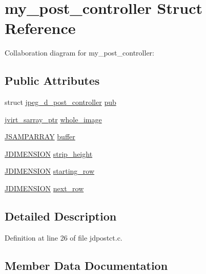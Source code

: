 \hypertarget{structmy__post__controller}{}\section{my\+\_\+post\+\_\+controller Struct Reference}
\label{structmy__post__controller}


Collaboration diagram for my\+\_\+post\+\_\+controller\+:
\subsection*{Public Attributes}
\begin{DoxyCompactItemize}
\item 
struct \mbox{\hyperlink{structjpeg__d__post__controller}{jpeg\+\_\+d\+\_\+post\+\_\+controller}} \mbox{\hyperlink{structmy__post__controller_a4618ce845c38c4c563bdd28af061b727}{pub}}
\item 
\mbox{\hyperlink{jpeglib_8h_abc0b975077507c35b5a577e3ce9e4d91}{jvirt\+\_\+sarray\+\_\+ptr}} \mbox{\hyperlink{structmy__post__controller_ac2336623f2e802993b35b7db30053b68}{whole\+\_\+image}}
\item 
\mbox{\hyperlink{jpeglib_8h_ac9d5d1b829ed51769db69a37271a7e91}{J\+S\+A\+M\+P\+A\+R\+R\+AY}} \mbox{\hyperlink{structmy__post__controller_aa571ce1fd2b5171a40d3b18d1496a2cf}{buffer}}
\item 
\mbox{\hyperlink{jmorecfg_8h_a04ed4674f6f1d0d50ec241531e38274f}{J\+D\+I\+M\+E\+N\+S\+I\+ON}} \mbox{\hyperlink{structmy__post__controller_a50ed0e70f9acab0995bbffb3aef6e9aa}{strip\+\_\+height}}
\item 
\mbox{\hyperlink{jmorecfg_8h_a04ed4674f6f1d0d50ec241531e38274f}{J\+D\+I\+M\+E\+N\+S\+I\+ON}} \mbox{\hyperlink{structmy__post__controller_a1e762395815d8f552d1a412cb5201575}{starting\+\_\+row}}
\item 
\mbox{\hyperlink{jmorecfg_8h_a04ed4674f6f1d0d50ec241531e38274f}{J\+D\+I\+M\+E\+N\+S\+I\+ON}} \mbox{\hyperlink{structmy__post__controller_a9aa9e3077c24ae10e47972c1955c6d38}{next\+\_\+row}}
\end{DoxyCompactItemize}


\subsection{Detailed Description}


Definition at line 26 of file jdpostct.\+c.



\subsection{Member Data Documentation}
\mbox{\label{structmy__post__controller_aa571ce1fd2b5171a40d3b18d1496a2cf}} 
